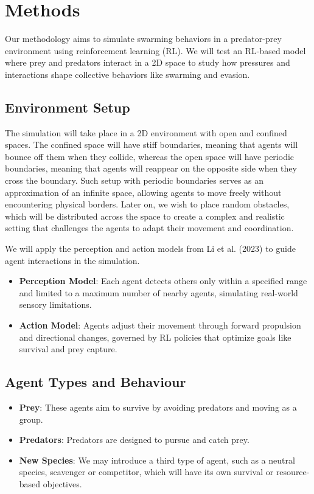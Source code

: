 \documentclass[9pt]{pnas-new}
\begin{document}
\section*{Methods}
Our methodology aims to simulate swarming behaviors in a predator-prey environment using reinforcement learning (RL). 
We will test an RL-based model where prey and predators interact in a 2D space to study how pressures and interactions shape collective behaviors like swarming and evasion.

\subsection{Environment Setup}
The simulation will take place in a 2D environment with open and confined spaces. The confined space will have stiff boundaries, meaning
that agents will bounce off them when they collide, whereas the open space will have periodic boundaries, meaning that agents will reappear on the opposite side when they cross the boundary.
Such setup with periodic boundaries serves as an approximation of an infinite space, allowing agents to move freely without encountering physical borders. 
Later on, we wish to place random obstacles, which will be distributed across the space to create a complex and realistic setting that challenges the agents to adapt their movement and coordination. 

We will apply the perception and action models from Li et al. (2023) \cite{li2023predator} to guide agent interactions in the simulation.

\begin{itemize}
    \item \textbf{Perception Model}: Each agent detects others only within a specified range and limited to a maximum number of nearby agents, simulating real-world sensory limitations.
    \item \textbf{Action Model}: Agents adjust their movement through forward propulsion and directional changes, governed by RL policies that optimize goals like survival and prey capture.
\end{itemize}

\subsection{Agent Types and Behaviour}
\begin{itemize}
    \item \textbf{Prey}: These agents aim to survive by avoiding predators and moving as a group.
    \item \textbf{Predators}: Predators are designed to pursue and catch prey.
    \item \textbf{New Species}: We may introduce a third type of agent, such as a neutral species, scavenger or competitor, which will have its own survival or resource-based objectives.
\end{itemize}
\end{document}
